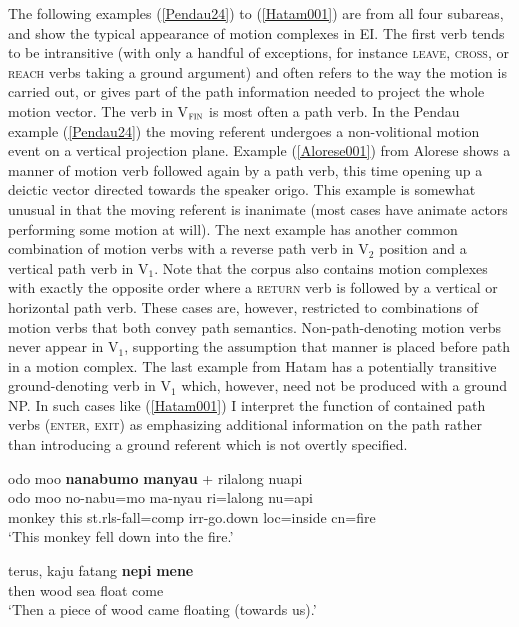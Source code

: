 The following examples (\ref{Pendau24}) to (\ref{Hatam001}) are from all four subareas, and show the typical appearance of motion complexes in EI. The first verb tends to be intransitive (with only a handful of exceptions, for instance \textsc{leave}, \textsc{cross}, or \textsc{reach} verbs taking a ground argument) and often refers to the way the motion is carried out, or gives part of the path information needed to project the whole motion vector. The verb in V$_{\textsc{fin}}$ is most often a path verb. In the Pendau example (\ref{Pendau24}) the moving referent undergoes a non-volitional motion event on a vertical projection plane. Example (\ref{Alorese001}) from Alorese shows a manner of motion verb followed again by a path verb, this time opening up a deictic vector directed towards the speaker origo. This example is somewhat unusual in that the moving referent is inanimate (most cases have animate actors performing some motion at will). The next example has another common combination of motion verbs with a reverse path verb in V$_{2}$ position and a vertical path verb in V$_{1}$. Note that the corpus also contains motion complexes with exactly the opposite order where a \textsc{return} verb is followed by a vertical or horizontal path verb. These cases are, however, restricted to combinations of motion verbs that both convey path semantics. Non-path-denoting motion verbs never appear in V$_1$, supporting the assumption that manner is placed before path in a motion complex. The last example from Hatam has a potentially transitive ground-denoting verb in V$_{1}$ which, however, need not be produced with a ground NP. In such cases like (\ref{Hatam001}) I interpret the function of contained path verbs (\textsc{enter}, \textsc{exit}) as emphasizing additional information on the path rather than introducing a ground referent which is not overtly specified.

\ea \label{Pendau24}
\gll odo moo \textbf{nanabumo} \textbf{manyau} + rilalong nuapi \\
odo moo no-nabu=mo ma-nyau ri=lalong nu=api \\
\glc monkey this \acs{st}.\acs{rls}-fall=\acs{comp} \acs{irr}-go.down \acs{loc}=inside \acs{cn}=fire \\
\glft `This monkey fell down into the fire.' 
\\ 
\z
\xe

\ea \label{Alorese001}
\gll terus, kaju fatang \textbf{nepi} \textbf{mene} \\
then wood sea float come \\
\glft `Then a piece of wood came floating (towards us).' \\ 
\z
\xe


